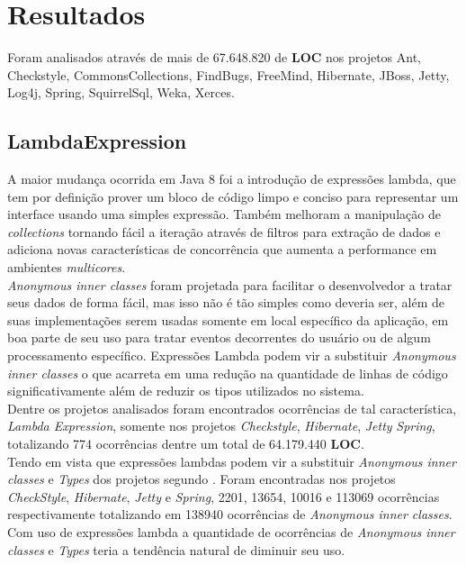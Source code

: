 \chapter{Resultados}
Foram analisados através de mais de 67.648.820 de \textbf{LOC} nos projetos Ant, Checkstyle, CommonsCollections,  FindBugs,  FreeMind,  Hibernate,  JBoss,  Jetty,  Log4j,  Spring,  SquirrelSql,  Weka,  Xerces.\\

\section{LambdaExpression}
A maior mudança ocorrida em Java 8 foi a introdução de expressões lambda, que tem por definição prover um bloco de código limpo e conciso para representar um interface usando uma simples expressão. Também melhoram a manipulação de \textit{collections} tornando fácil a iteração através de filtros para extração de dados e adiciona novas características de concorrência que aumenta a performance em ambientes \textit{multicores}.\\

\textit{Anonymous inner classes} foram projetada para facilitar o desenvolvedor a tratar seus dados de forma fácil, mas isso não é tão simples como deveria ser, além de suas implementações serem usadas somente em local específico da aplicação, em boa parte de seu uso para tratar eventos decorrentes do usuário ou de algum processamento específico. Expressões Lambda podem vir a substituir \textit{Anonymous inner classes} o que acarreta em uma redução na quantidade de linhas de código significativamente além de reduzir os tipos utilizados no sistema.\\

Dentre os projetos analisados foram encontrados ocorrências de tal característica, \textit{Lambda Expression}, somente nos projetos \textit{Checkstyle}, \textit{Hibernate}, \textit{Jetty} \textit{Spring}, totalizando 774 ocorrências dentre um total de 64.179.440 \textbf{LOC}.\\

Tendo em vista que expressões lambdas podem vir a substituir \textit{Anonymous inner classes} e \textit{Types} dos projetos segundo \cite{Java8Lambda}. Foram encontradas nos projetos \textit{CheckStyle}, \textit{Hibernate}, \textit{Jetty} e \textit{Spring}, 2201, 13654, 10016 e 113069 ocorrências respectivamente totalizando em 138940 ocorrências de \textit{Anonymous inner classes}. Com uso de expressões lambda a quantidade de ocorrências de \textit{Anonymous inner classes} e \textit{Types} teria a tendência natural de diminuir seu uso.\\

